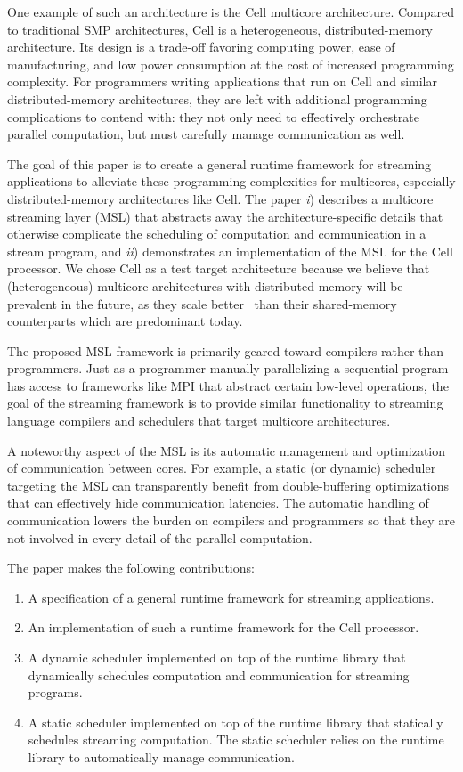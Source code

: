 One example of such an architecture is the Cell multicore
architecture. Compared to traditional SMP architectures, Cell is a
heterogeneous, distributed-memory architecture. Its design
is a trade-off favoring computing power, ease of manufacturing, and
low power consumption at the cost of increased programming
complexity. For programmers writing applications that run on Cell and
similar distributed-memory architectures, they are left with
additional programming complications to contend with: they not only
need to effectively orchestrate parallel computation, but must
carefully manage communication as well.

The goal of this paper is to create a general runtime framework for
streaming applications to alleviate these programming complexities for
multicores, especially distributed-memory architectures like Cell. The
paper \emph{i}) describes a multicore streaming layer (MSL) that abstracts
away the architecture-specific details that otherwise complicate the
scheduling of computation and communication in a stream program, and
\emph{ii}) demonstrates an implementation of the MSL for the Cell
processor. We chose Cell as a test target architecture because we
believe that (heterogeneous) multicore architectures with distributed
memory will be prevalent in the future, as they scale
better~\cite{theo-phd-07} than their shared-memory counterparts which
are predominant today.

The proposed MSL framework is primarily geared toward compilers rather
than programmers. Just as a programmer manually parallelizing a
sequential program has access to frameworks like MPI that abstract
certain low-level operations, the goal of the streaming framework is
to provide similar functionality to streaming language compilers and
schedulers that target multicore architectures. 

A noteworthy aspect of the MSL is its automatic management and
optimization of communication between cores. For example, a static (or
dynamic) scheduler targeting the MSL can transparently benefit from
double-buffering optimizations that can effectively hide communication
latencies. The automatic handling of communication lowers the burden
on compilers and programmers so that they are not involved in every
detail of the parallel computation.

The paper makes the following contributions:
\begin{enumerate}
\item A specification of a general runtime framework for streaming applications.
\item An implementation of such a runtime framework for the Cell processor.
\item A dynamic scheduler implemented on top of the runtime library
  that dynamically schedules computation and communication for
  streaming programs.
\item A static scheduler implemented on top of the runtime library
  that statically schedules streaming computation. The static
  scheduler relies on the runtime library to automatically manage
  communication.
\end{enumerate}

